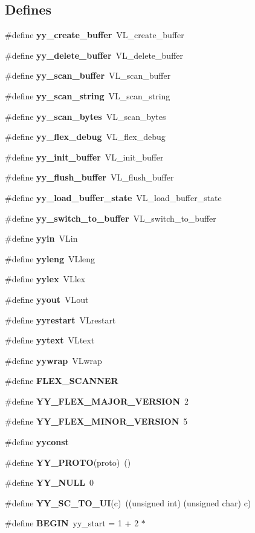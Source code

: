 \subsection*{Defines}
\begin{CompactItemize}
\item 
\#define {\bf yy\_\-create\_\-buffer}\ VL\_\-create\_\-buffer
\item 
\#define {\bf yy\_\-delete\_\-buffer}\ VL\_\-delete\_\-buffer
\item 
\#define {\bf yy\_\-scan\_\-buffer}\ VL\_\-scan\_\-buffer
\item 
\#define {\bf yy\_\-scan\_\-string}\ VL\_\-scan\_\-string
\item 
\#define {\bf yy\_\-scan\_\-bytes}\ VL\_\-scan\_\-bytes
\item 
\#define {\bf yy\_\-flex\_\-debug}\ VL\_\-flex\_\-debug
\item 
\#define {\bf yy\_\-init\_\-buffer}\ VL\_\-init\_\-buffer
\item 
\#define {\bf yy\_\-flush\_\-buffer}\ VL\_\-flush\_\-buffer
\item 
\#define {\bf yy\_\-load\_\-buffer\_\-state}\ VL\_\-load\_\-buffer\_\-state
\item 
\#define {\bf yy\_\-switch\_\-to\_\-buffer}\ VL\_\-switch\_\-to\_\-buffer
\item 
\#define {\bf yyin}\ VLin
\item 
\#define {\bf yyleng}\ VLleng
\item 
\#define {\bf yylex}\ VLlex
\item 
\#define {\bf yyout}\ VLout
\item 
\#define {\bf yyrestart}\ VLrestart
\item 
\#define {\bf yytext}\ VLtext
\item 
\#define {\bf yywrap}\ VLwrap
\item 
\#define {\bf FLEX\_\-SCANNER}
\item 
\#define {\bf YY\_\-FLEX\_\-MAJOR\_\-VERSION}\ 2
\item 
\#define {\bf YY\_\-FLEX\_\-MINOR\_\-VERSION}\ 5
\item 
\#define {\bf yyconst}
\item 
\#define {\bf YY\_\-PROTO}(proto)\ ()
\item 
\#define {\bf YY\_\-NULL}\ 0
\item 
\#define {\bf YY\_\-SC\_\-TO\_\-UI}(c)\ ((unsigned int) (unsigned char) c)
\item 
\#define {\bf BEGIN}\ yy\_\-start = 1 + 2 $\ast$
\item 

\end{CompactItemize}
